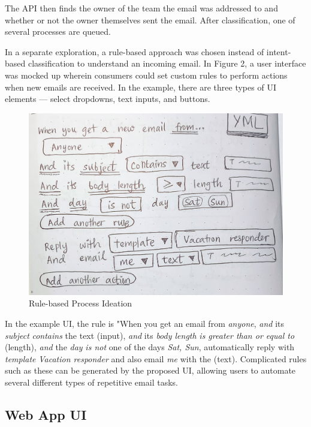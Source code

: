 \documentclass{article}
\begin{document}
The API then finds the owner of the team the email was addressed to and whether or not the owner themselves sent the email. After classification, one of several processes are queued.

In a separate exploration, a rule-based approach was chosen instead of intent-based classification to understand an incoming email. In Figure 2, a user interface was mocked up wherein consumers could set custom rules to perform actions when new emails are received. In the example, there are three types of UI elements --- select dropdowns, text inputs, and buttons.

\begin{figure}\centering
	\includegraphics[scale=0.092]{drawing-rules-ui.jpg}
	\caption{Rule-based Process Ideation}
\end{figure}

In the example UI, the rule is "When you get an email from \emph{anyone}, \emph{and} its \emph{subject} \emph{contains} the text (input), \emph{and} its \emph{body length} \emph{is greater than or equal to} (length), \emph{and} the \emph{day} \emph{is not} one of the days \emph{Sat, Sun}, automatically reply with \emph{template} \emph{Vacation responder} and also email \emph{me} with the (text). Complicated rules such as these can be generated by the proposed UI, allowing users to automate several different types of repetitive email tasks.

\subsection{Web App UI}
\end{document}
